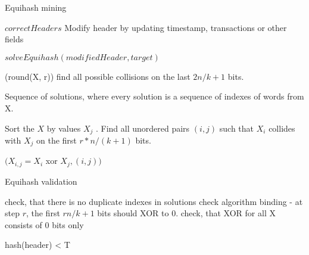 \begin{algorithm}[H]
    \caption{Equihash mining}
    \label{alg:eq:mining}
    \begin{algorithmic}[1]

                \Return $correctHeaders$
            \Else
                \State Modify header by updating timestamp, transactions or other fields

                \Return $solveEquihash(modifiedHeader, target)$
            \EndIf
        \EndFunction

              (round(X, r))
            \EndFor
            \State find all possible collisions on the last $2n/k+1$ bits.

            \Return Sequence of solutions, where every solution is a sequence of indexes of words from X.
        \EndFunction

        \State Sort the $X$ by values $X_j$ .
        \State Find all unordered pairs $(i, j)$ such that $X_i$ collides with $X_j$ on the first $r * n/(k+1)$ bits.

        \Return $(X_{i,j} = X_i$ xor $X_j, (i , j))$
        \EndFunction

    \end{algorithmic}
\end{algorithm}

\begin{algorithm}[H]
    \caption{Equihash validation}
    \label{alg:eq:valudation}
    \begin{algorithmic}[1]
        \State check, that there is no duplicate indexes in solutions
        \State check algorithm binding - at step $r$, the first $rn/k+1$ bits should XOR to 0.
        \State check, that XOR for all X consists of 0 bits only

        \Return hash(header) < T
        \EndFunction
    \end{algorithmic}
\end{algorithm}

